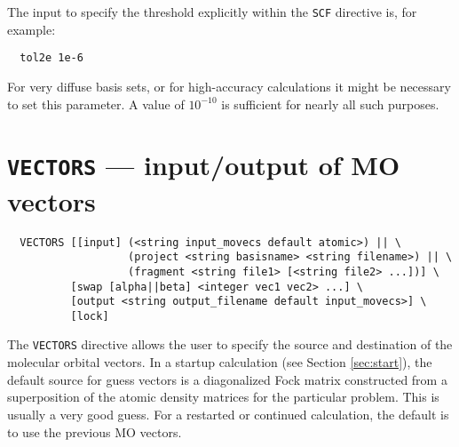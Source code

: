 The input to specify the threshold explicitly within the \verb+SCF+
directive is, for example:

\begin{verbatim}
  tol2e 1e-6
\end{verbatim}

For very diffuse basis sets, or for high-accuracy calculations it
might be necessary to set this parameter.  A value of $10^{-10}$ is
sufficient for nearly all such purposes.

\section{{\tt VECTORS} --- input/output of MO vectors}
\label{sec:vectors}


\begin{verbatim}
  VECTORS [[input] (<string input_movecs default atomic>) || \
                   (project <string basisname> <string filename>) || \
                   (fragment <string file1> [<string file2> ...])] \
          [swap [alpha||beta] <integer vec1 vec2> ...] \
          [output <string output_filename default input_movecs>] \
          [lock]
\end{verbatim}

The \verb+VECTORS+ directive allows the user to specify the source and
destination of the molecular orbital vectors.  In a startup
calculation (see Section \ref{sec:start}), the default source for
guess vectors is a diagonalized Fock matrix constructed from a
superposition of the atomic density matrices for the particular
problem.  This is usually a very good guess.  For a restarted or
continued calculation, the default is to use the previous MO vectors.

